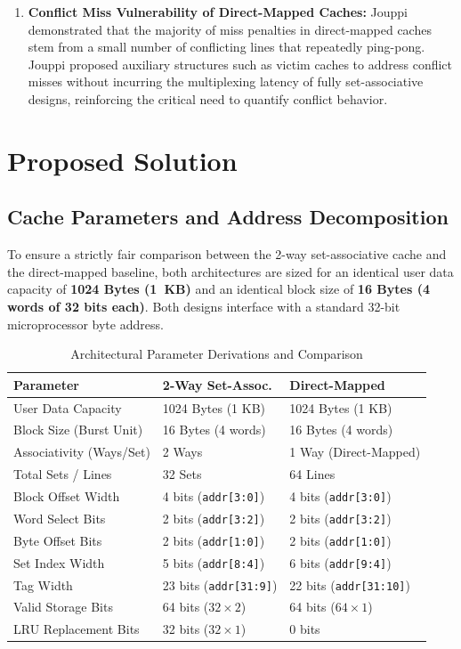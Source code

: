 \documentclass[journal,10pt,twocolumn]{IEEEtran}
\begin{document}
\begin{enumerate}
    \item \textbf{Conflict Miss Vulnerability of Direct-Mapped Caches:} Jouppi~\cite{jouppi1990improving} demonstrated that the majority of miss penalties in direct-mapped caches stem from a small number of conflicting lines that repeatedly ping-pong. Jouppi proposed auxiliary structures such as victim caches to address conflict misses without incurring the multiplexing latency of fully set-associative designs, reinforcing the critical need to quantify conflict behavior.
\end{enumerate}

\section{Proposed Solution}

\subsection{Cache Parameters and Address Decomposition}
To ensure a strictly fair comparison between the 2-way set-associative cache and the direct-mapped baseline, both architectures are sized for an identical user data capacity of \textbf{1024 Bytes (1~KB)} and an identical block size of \textbf{16 Bytes (4 words of 32 bits each)}. Both designs interface with a standard 32-bit microprocessor byte address.

\begin{table}[htbp]
\centering
\caption{Architectural Parameter Derivations and Comparison}
\label{tab:params}
\begin{tabular}{p{2.6cm}p{2.3cm}p{2.3cm}}
\toprule
\textbf{Parameter} & \textbf{2-Way Set-Assoc.} & \textbf{Direct-Mapped} \\
\midrule
User Data Capacity & 1024 Bytes (1 KB) & 1024 Bytes (1 KB) \\
Block Size (Burst Unit) & 16 Bytes (4 words) & 16 Bytes (4 words) \\
Associativity (Ways/Set) & 2 Ways & 1 Way (Direct-Mapped) \\
Total Sets / Lines & 32 Sets & 64 Lines \\
Block Offset Width & 4 bits (\texttt{addr[3:0]}) & 4 bits (\texttt{addr[3:0]}) \\
Word Select Bits & 2 bits (\texttt{addr[3:2]}) & 2 bits (\texttt{addr[3:2]}) \\
Byte Offset Bits & 2 bits (\texttt{addr[1:0]}) & 2 bits (\texttt{addr[1:0]}) \\
Set Index Width & 5 bits (\texttt{addr[8:4]}) & 6 bits (\texttt{addr[9:4]}) \\
Tag Width & 23 bits (\texttt{addr[31:9]}) & 22 bits (\texttt{addr[31:10]}) \\
Valid Storage Bits & 64 bits ($32 \times 2$) & 64 bits ($64 \times 1$) \\
LRU Replacement Bits & 32 bits ($32 \times 1$) & 0 bits \\
\bottomrule
\end{tabular}
\end{table}
\end{document}
